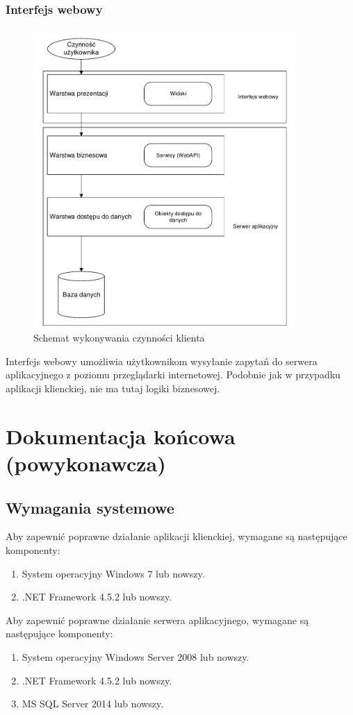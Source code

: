 \documentclass[10pt,a4paper]{article}
\begin{document}
\subsubsection{Interfejs webowy}
\begin{figure}[H]
	\centering
	\includegraphics[width=10cm]{Resources/PDF/architecture-web-client.pdf}
	\caption{Schemat wykonywania czynności klienta}
\end{figure}
Interfejs webowy umożliwia użytkownikom wysyłanie zapytań do serwera aplikacyjnego z poziomu przeglądarki internetowej. Podobnie jak w przypadku aplikacji klienckiej, nie ma tutaj logiki biznesowej.

\newpage
\section{Dokumentacja końcowa (powykonawcza)}

\subsection{Wymagania systemowe}
Aby zapewnić poprawne działanie aplikacji klienckiej, wymagane są następujące komponenty:
\begin{enumerate}
	\item System operacyjny Windows 7 lub nowszy.
	\item .NET Framework 4.5.2 lub nowszy.
\end{enumerate}
Aby zapewnić poprawne działanie serwera aplikacyjnego, wymagane są następujące komponenty:
\begin{enumerate}
	\item System operacyjny Windows Server 2008 lub nowszy.
	\item .NET Framework 4.5.2 lub nowszy.
	\item MS SQL Server 2014 lub nowszy.
\end{enumerate}
\end{document}
